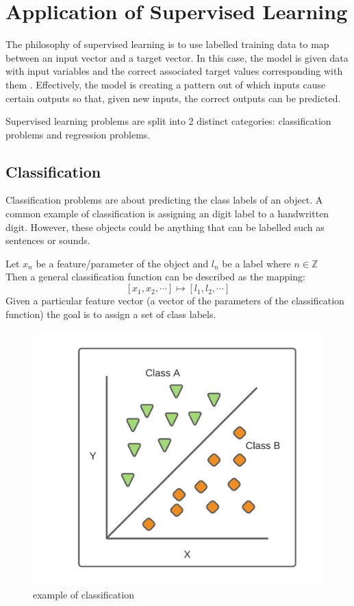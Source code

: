 \documentclass[10pt,a4paper]{report}
\begin{document}
		\section{Application of Supervised Learning}
			The philosophy of supervised learning is to use labelled training data to map between
			an input vector and a target vector. In this case, the model is given
			data with input variables and the correct associated target values corresponding with them \autocite[p. 105]{DeepLearning}.
			Effectively, the model is creating a pattern out of which inputs cause certain outputs so that,
			given new inputs, the correct outputs can be predicted. \par
			Supervised learning problems are split into 2 distinct categories: classification problems and regression problems.

			\subsection{Classification}
				Classification problems are about predicting the class labels of an object. A common example
				of classification is assigning an digit label to a handwritten digit. However, these objects
				could be anything that can be labelled such as sentences or sounds. \par
				Let $x_n$ be a feature/parameter of the object and $l_n$ be a label where $n \in \mathbb{Z}$\\
				Then a general classification function can be described as the mapping: \[[x_1,x_2,\cdots] \mapsto [l_1,l_2,\cdots]\]
				Given a particular feature vector (a vector of the parameters of the classification function) the goal is to assign a set of class labels.
				\begin{figure}[h]
					\centering
					\includegraphics[scale=0.7]{classification-diagram.png}
					\caption{example of classification}
					\label{fig:classifcation}
				\end{figure}
\end{document}
